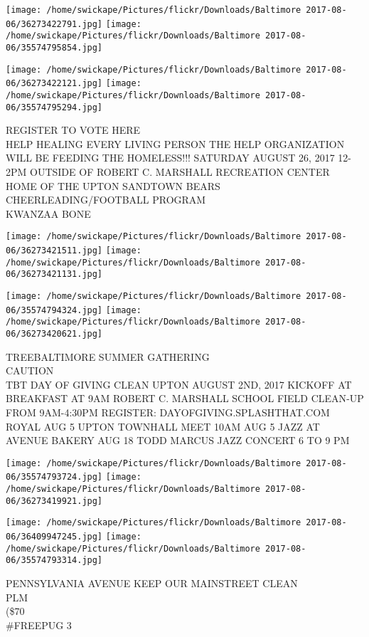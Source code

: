 \documentclass[10pt,letterpaper]{article}
\begin{document}
\texttt{[image: /home/swickape/Pictures/flickr/Downloads/Baltimore 2017-08-06/36273422791.jpg]}
\texttt{[image: /home/swickape/Pictures/flickr/Downloads/Baltimore 2017-08-06/35574795854.jpg]}

\texttt{[image: /home/swickape/Pictures/flickr/Downloads/Baltimore 2017-08-06/36273422121.jpg]}
\texttt{[image: /home/swickape/Pictures/flickr/Downloads/Baltimore 2017-08-06/35574795294.jpg]}

REGISTER TO VOTE HERE\\
HELP HEALING EVERY LIVING PERSON THE HELP ORGANIZATION WILL BE FEEDING THE HOMELESS!!! SATURDAY AUGUST 26, 2017 12{-}2PM OUTSIDE OF ROBERT C. MARSHALL RECREATION CENTER\\
HOME OF THE UPTON SANDTOWN BEARS CHEERLEADING/FOOTBALL PROGRAM\\
KWANZAA BONE
\pagebreak

\texttt{[image: /home/swickape/Pictures/flickr/Downloads/Baltimore 2017-08-06/36273421511.jpg]}
\texttt{[image: /home/swickape/Pictures/flickr/Downloads/Baltimore 2017-08-06/36273421131.jpg]}

\texttt{[image: /home/swickape/Pictures/flickr/Downloads/Baltimore 2017-08-06/35574794324.jpg]}
\texttt{[image: /home/swickape/Pictures/flickr/Downloads/Baltimore 2017-08-06/36273420621.jpg]}

TREEBALTIMORE SUMMER GATHERING\\
CAUTION\\
TBT DAY OF GIVING CLEAN UPTON AUGUST 2ND, 2017 KICKOFF AT BREAKFAST AT 9AM ROBERT C. MARSHALL SCHOOL FIELD CLEAN{-}UP FROM 9AM{-}4:30PM REGISTER: DAYOFGIVING.SPLASHTHAT.COM\\
ROYAL AUG 5 UPTON TOWNHALL MEET 10AM AUG 5 JAZZ AT AVENUE BAKERY AUG 18 TODD MARCUS JAZZ CONCERT 6 TO 9 PM
\pagebreak

\texttt{[image: /home/swickape/Pictures/flickr/Downloads/Baltimore 2017-08-06/35574793724.jpg]}
\texttt{[image: /home/swickape/Pictures/flickr/Downloads/Baltimore 2017-08-06/36273419921.jpg]}

\texttt{[image: /home/swickape/Pictures/flickr/Downloads/Baltimore 2017-08-06/36409947245.jpg]}
\texttt{[image: /home/swickape/Pictures/flickr/Downloads/Baltimore 2017-08-06/35574793314.jpg]}

PENNSYLVANIA AVENUE KEEP OUR MAINSTREET CLEAN\\
PLM\\
(\$70\\
\#FREEPUG 3
\pagebreak
\end{document}
